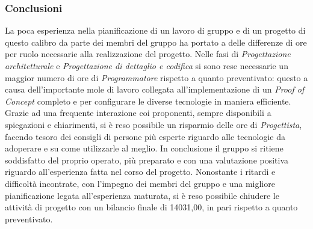 \subsubsection{Conclusioni}
La poca esperienza nella pianificazione di un lavoro di gruppo e di un progetto di questo calibro da parte dei membri del gruppo ha portato a delle differenze di ore per ruolo necessarie alla realizzazione del progetto. Nelle fasi di \textit{Progettazione architetturale} e \textit{Progettazione di dettaglio e codifica} si sono rese necessarie un maggior numero di ore di \textit{Programmatore} rispetto a quanto preventivato: questo a causa dell'importante mole di lavoro collegata all'implementazione di un \textit{Proof of Concept} completo e per configurare le diverse tecnologie in maniera efficiente. Grazie ad una frequente interazione coi proponenti, sempre disponibili a spiegazioni e chiarimenti, si è reso possibile un risparmio delle ore di \textit{Progettista}, facendo tesoro dei consigli di persone più esperte riguardo alle tecnologie da adoperare e su come utilizzarle al meglio. In conclusione il gruppo si ritiene soddisfatto del proprio operato, più preparato e con una valutazione positiva riguardo all'esperienza fatta nel corso del progetto. Nonostante i ritardi e difficoltà incontrate, con l'impegno dei membri del gruppo e una migliore pianificazione legata all'esperienza maturata, si è reso possibile chiudere le attività di progetto con un bilancio finale di 14031,00\EURdig, in pari rispetto a quanto preventivato.
